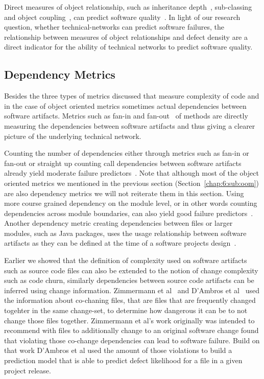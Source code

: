 Direct measures of object relationship, such as inheritance depth~\cite{chidamber:tse:1994}, sub-classing~\cite{chidamber:tse:1994} and object coupling~\cite{chidamber:tse:1994}, can predict software quality~\cite{nagappan:icse:2006,arisholm:isese:2006,english:promise:2009}.
In light of our research question, whether technical-networks can predict software failures, the relationship between measures of object relationships and defect density are a direct indicator for the ability of technical networks to predict software quality.


\subsection{Dependency Metrics}
\label{chap:6:sub:depmet}
Besides the three types of metrics discussed that measure complexity of code and in the case of object oriented metrics sometimes actual dependencies between software artifacts.
Metrics such as fan-in and fan-out~\cite{henry:tse:1981} of methods are directly measuring the dependencies between software artifacts and thus giving a clearer picture of the underlying technical network.

Counting the number of dependencies either through metrics such as fan-in or fan-out or straight up counting call dependencies between software artifacts already yield moderate failure predictors~\cite{cataldo:icse:2011,nagappan:icse:2006,arisholm:isese:2006,knab:msr:2006,shin:msr:2009}.
Note that although most of the object oriented metrics we mentioned in the previous section (Section~\ref{chap:6:sub:oom}) are also dependency metrics we will not reiterate them in this section. 
Using more course grained dependency on the module level, or in other words counting dependencies across module boundaries, can also yield good failure predictors~\cite{jiang:promise:2008}.
Another dependency metric creating dependencies between files or larger modules, such as Java packages, uses the usage relationship between software artifacts as they can be defined at the time of a software projects design~\cite{schroeter:isese:2006,dualaekoko:esem:2009}.

Earlier we showed that the definition of complexity used on software artifacts such as source code files can also be extended to the notion of change complexity such as code churn, similarly dependencies between source code artifacts can be inferred using change information.
Zimmermann et al~\cite{zimmermann:icse:2004} and D'Ambros et al~\cite{dambros:wcre:2009} used the information about co-chaning files, that are files that are frequently changed togehter in the same change-set, to determine how dangerous it can be to not change those files together.
Zimmermann et al's work originally was intended to recommend with files to additionally change to an original software change  found that violating those co-change dependencies can lead to software failure.
Build on that work D'Ambros et al used the amount of those violations to build a prediction model that is able to predict defect likelihood for a file in a given project release. 


